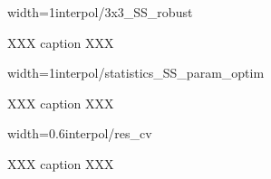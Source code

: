 \begin{my_figure}[h]{width=1\textwidth}{interpol/3x3_SS_robust}
  \caption{XXX caption XXX}
  \label{fig:interpol/3x3_SS_robust}
\end{my_figure}

\begin{my_figure}[h]{width=1\textwidth}{interpol/statistics_SS_param_optim}
  \caption{XXX caption XXX}
  \label{fig:interpol/statistics_SS_param_optim}
\end{my_figure}

\begin{my_figure}[h]{width=0.6\textwidth}{interpol/res_cv}
  \caption{XXX caption XXX}
  \label{fig:interpol/res_cv}
\end{my_figure}


